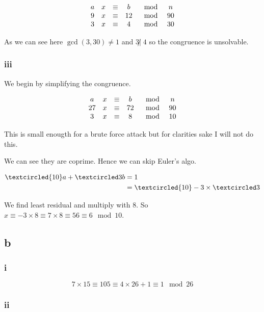 \documentclass{article}
\begin{document}
$$\begin{matrix}
		a & x & \equiv & b  & \mod & n  \\
		9 & x & \equiv & 12 & \mod & 90 \\
		3 & x & \equiv & 4  & \mod & 30
	\end{matrix}$$

As we can see here $\gcd (3,30) \ne 1$ and $3 \not|\;4$ so the congruence is unsolvable.

\subsubsection{iii}


We begin by simplifying the congruence.

$$\begin{matrix}
		a  & x & \equiv & b  & \mod & n  \\
		27 & x & \equiv & 72 & \mod & 90 \\
		3  & x & \equiv & 8  & \mod & 10 \\
	\end{matrix}$$

This is small enougth for a brute force attack but for clarities sake I will not do this.

We can see they are coprime. Hence we can skip Euler's algo.

\begin{align*}
	\textcircled{10}a + \textcircled 3b & = 1                                           \\
	                                    & = \textcircled {10} - 3 \times \textcircled 3
\end{align*}

We find least residual and multiply with $8$. So $x \equiv -3 \times 8 \equiv 7 \times 8 \equiv 56 \equiv 6 \mod 10$.

\subsection{b}

\subsubsection{i}

$$7 \times 15 \equiv 105 \equiv 4 \times 26 + 1 \equiv 1 \mod 26$$

\subsubsection{ii}
\end{document}
